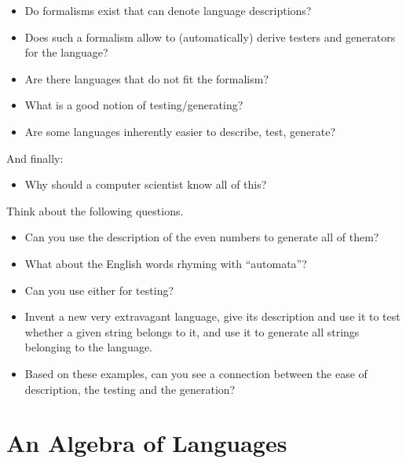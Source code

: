 \begin{itemize}
	\item Do formalisms exist that can denote language descriptions?
	
	\item Does such a formalism allow to (automatically) derive testers and generators for the language?
	
	\item Are there languages that do not fit the formalism?
	
	\item What is a good notion of testing/generating?
	
	\item Are some languages inherently easier to describe, test, generate?
\end{itemize}

And finally:

\begin{itemize}
\item[] Why should a computer scientist know all of this?
\end{itemize}

\begin{exercise}
Think about the following questions.
\begin{itemize}
\item Can you use the description of the even numbers to generate all of them?

\item What about the English words rhyming with ``automata''?

\item Can you use either for testing?

\item Invent a new very extravagant language, give its description and use
it to test whether a given string belongs to it, and use it to
generate all strings belonging to the language.

\item Based on these examples, can you see a connection between the ease of
description, the testing and the generation?
\end{itemize}
\end{exercise}


\section{An Algebra of Languages}

